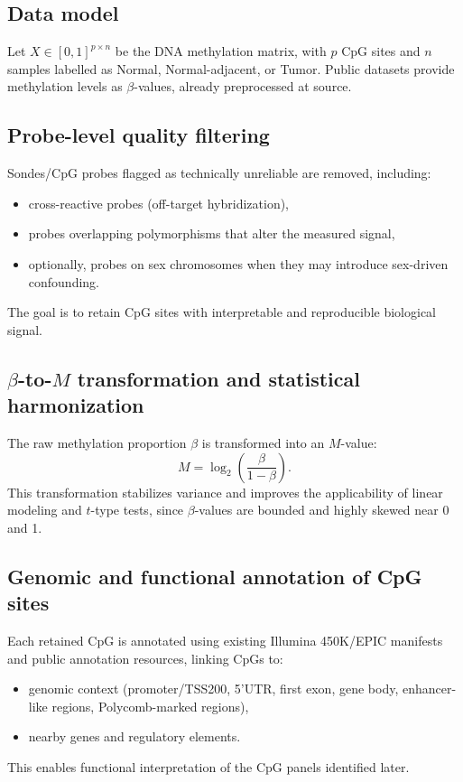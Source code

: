 \documentclass[10pt]{extarticle}
\begin{document}
\subsection{Data model}
Let $X \in [0,1]^{p \times n}$ be the DNA methylation matrix, with $p$ CpG sites and $n$ samples labelled as Normal, Normal-adjacent, or Tumor. Public datasets provide methylation levels as $\beta$-values, already preprocessed at source.

\subsection{Probe-level quality filtering}
Sondes/CpG probes flagged as technically unreliable are removed, including:
\begin{itemize}[label=-]
    \item cross-reactive probes (off-target hybridization),
    \item probes overlapping polymorphisms that alter the measured signal,
    \item optionally, probes on sex chromosomes when they may introduce sex-driven confounding.
\end{itemize}
The goal is to retain CpG sites with interpretable and reproducible biological signal.

\subsection{$\beta$-to-$M$ transformation and statistical harmonization}
The raw methylation proportion $\beta$ is transformed into an $M$-value:
\[
M = \log_2 \left( \frac{\beta}{1 - \beta} \right).
\]
This transformation stabilizes variance and improves the applicability of linear modeling and $t$-type tests, since $\beta$-values are bounded and highly skewed near 0 and 1.  

\subsection{Genomic and functional annotation of CpG sites}
Each retained CpG is annotated using existing Illumina 450K/EPIC manifests and public annotation resources, linking CpGs to:
\begin{itemize}[label=-]
    \item genomic context (promoter/TSS200, 5'UTR, first exon, gene body, enhancer-like regions, Polycomb-marked regions),
    \item nearby genes and regulatory elements.
\end{itemize}
This enables functional interpretation of the CpG panels identified later.
\end{document}

